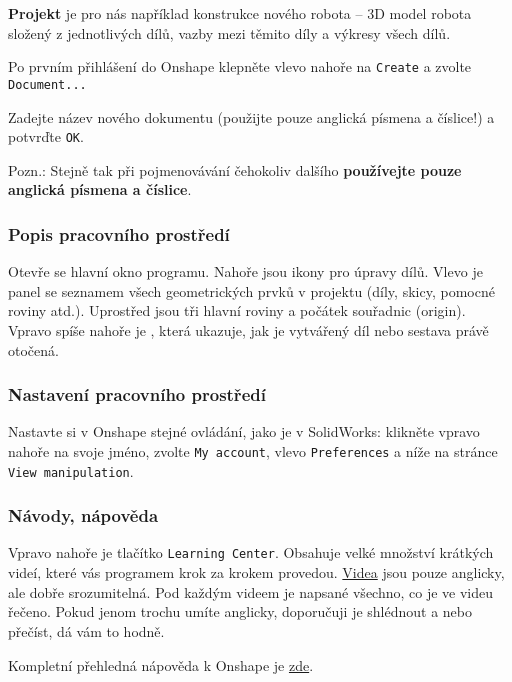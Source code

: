  \textbf{Projekt} je pro nás například konstrukce nového robota -- 3D model robota složený z jednotlivých dílů, vazby mezi těmito díly a výkresy všech dílů. 
 
 Po prvním přihlášení do Onshape klepněte vlevo nahoře na {\tt Create} a zvolte {\tt Document...} 

Zadejte název nového dokumentu (použijte pouze anglická písmena a číslice!) a potvrďte {\tt OK}.  

Pozn.: Stejně tak při pojmenovávání čehokoliv dalšího \textbf{používejte pouze anglická písmena a číslice}.

\subsubsection{Popis pracovního prostředí}

Otevře se hlavní okno programu. 
Nahoře jsou ikony pro úpravy dílů. 
Vlevo je panel se seznamem všech geometrických prvků v projektu (díly, skicy, pomocné roviny atd.). 
Uprostřed jsou tři hlavní roviny a počátek souřadnic (origin). 
Vpravo spíše nahoře je , která ukazuje, jak je vytvářený díl nebo sestava právě otočená. 

\subsubsection{Nastavení pracovního prostředí}

Nastavte si v Onshape stejné ovládání, jako je v SolidWorks: 
klikněte vpravo nahoře na svoje jméno, zvolte \texttt{My account}, vlevo \texttt{Preferences} a níže na stránce \texttt{View manipulation}.  


\subsubsection{Návody, nápověda}

Vpravo nahoře je tlačítko {\tt Learning Center}. Obsahuje velké množství krátkých videí, které vás programem krok za krokem provedou. 
\href{https://learn.onshape.com/courses/fundamentals-navigating-onshape}{Videa} jsou pouze anglicky, ale dobře srozumitelná. Pod každým videem je napsané všechno, co je ve videu řečeno. Pokud jenom trochu umíte anglicky, doporučuji je shlédnout a nebo přečíst, dá vám to hodně. 

Kompletní přehledná nápověda k Onshape je  \href{https://cad.onshape.com/help/Content/gettingstarted.htm?tocpath=Desktop\%20Help\%7C_____3}{zde}.

